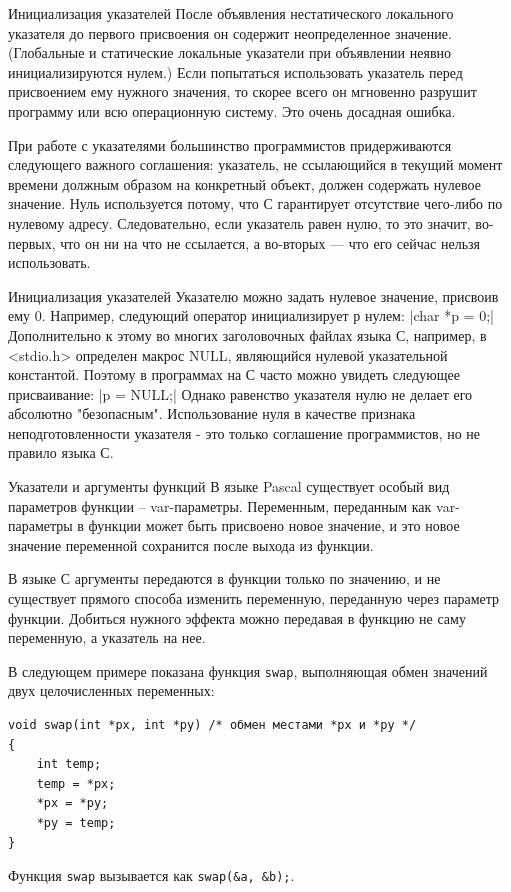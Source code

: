\documentclass{beamer}
\begin{document}
\begin{frame}{Инициализация указателей}
    После объявления нестатического локального указателя до первого присвоения он содержит неопределенное значение. (Глобальные и статические локальные указатели при объявлении неявно инициализируются нулем.) Если попытаться использовать указатель перед присвоением ему нужного значения, то скорее всего он мгновенно разрушит программу или всю операционную систему. Это очень досадная ошибка.
    
    \medskip
    При работе с указателями большинство программистов придерживаются следующего важного соглашения: указатель, не ссылающийся в текущий момент времени должным образом на конкретный объект, должен содержать нулевое значение. Нуль используется потому, что С гарантирует отсутствие чего-либо по нулевому адресу. Следовательно, если указатель равен нулю, то это значит, во-первых, что он ни на что не ссылается, а во-вторых — что его сейчас нельзя использовать.
\end{frame}

\begin{frame}{Инициализация указателей}
    Указателю можно задать нулевое значение, присвоив ему 0. Например, следующий оператор инициализирует р нулем:
    \medskip
    |char *p = 0;|
    \medskip
    Дополнительно к этому во многих заголовочных файлах языка С, например, в <stdio.h> определен макрос NULL, являющийся нулевой указательной константой. Поэтому в программах на С
    часто можно увидеть следующее присваивание:
    \medskip
    |p = NULL;|
    \medskip
    Однако равенство указателя нулю не делает его абсолютно "безопасным". Использование нуля в качестве признака неподготовленности указателя - это только соглашение программистов, но не правило языка С.
\end{frame}

\begin{frame}[fragile]{Указатели и аргументы функций}
    В языке Pascal существует особый вид параметров функции – var-параметры. Переменным, переданным как var-параметры в функции может быть присвоено новое значение, и это новое значение переменной сохранится после выхода из функции.
    
    \medskip
    В языке С аргументы передаются в функции только по значению, и не существует прямого способа изменить переменную, переданную через параметр функции. Добиться нужного эффекта можно передавая в функцию не саму переменную, а указатель на нее.
    
    \medskip
    В следующем примере показана функция \texttt{swap}, выполняющая обмен значений двух целочисленных переменных:
    
    \medskip
\begin{verbatim}
void swap(int *px, int *py) /* обмен местами *рх и *ру */
{
    int temp;
    temp = *px;
    *px = *py;
    *py = temp;
}
\end{verbatim}
    \medskip
    Функция \texttt{swap} вызывается как \texttt{swap(\&a, \&b);}.
\end{frame}
\end{document}
